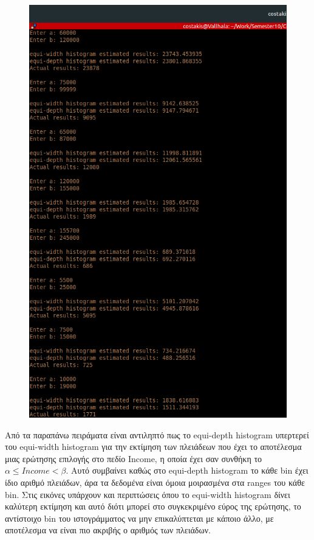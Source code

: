 \documentclass{article}[40pt]
\begin{document}
\begin{figure}[htpb!]
\includegraphics[scale=0.4]{estimations3.png}
\end{figure}
\newpage
Από τα παραπάνω πειράματα είναι αντιληπτό πως το equi-depth histogram υπερτερεί του equi-width histogram για την εκτίμηση των πλειάδεων που έχει το αποτέλεσμα μιας ερώτησης επιλογής στο πεδίο Income, η οποία έχει σαν συνθήκη το $α \leq Income < β.$ Αυτό συμβαίνει καθώς στο equi-depth histogram το κάθε bin έχει ίδιο αριθμό πλειάδων, άρα τα δεδομένα είναι όμοια μοιρασμένα στα ranges του κάθε bin. Στις εικόνες υπάρχουν και περιπτώσεις όπου το equi-width histogram δίνει καλύτερη εκτίμηση και αυτό διότι μπορεί στο συγκεκριμένο εύρος της ερώτησης, το αντίστοιχο bin του ιστογράμματος να μην επικαλύπτεται με κάποιο άλλο, με αποτέλεσμα να είναι πιο ακριβής ο αριθμός των πλειάδων. 
\end{document}
